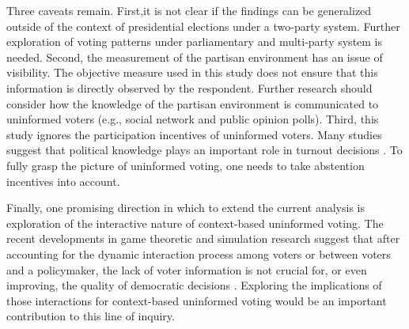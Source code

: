 \documentclass[letterpaper, 12pt]{article}
\begin{document}
    \par Three caveats remain. First,it is not clear if the findings can be generalized outside of the context of presidential elections under a two-party system. Further exploration of voting patterns under parliamentary and multi-party system is needed. Second, the measurement of the partisan environment has an issue of visibility. The objective measure used in this study does not ensure that this information is directly observed by the respondent. Further research should consider how the knowledge of the partisan environment is communicated to uninformed voters (e.g., social network and public opinion polls). Third, this study ignores the participation incentives of uninformed voters. Many studies suggest that political knowledge plays an important role in turnout decisions \citep{Matsusaka1995exvo, Dellicarpini1996wham, Feddersen1996thsw, Lassen2005thef, Larcinese2007dopo, Gemenis2014voad}. To fully grasp the picture of uninformed voting, one needs to take abstention incentives into account.
    
    \par Finally, one promising direction in which to extend the current analysis is exploration of the interactive nature of context-based uninformed voting. The recent developments in game theoretic and simulation research suggest that after accounting for the dynamic interaction process among voters or between voters and a policymaker, the lack of voter information is not crucial for, or even improving, the quality of democratic decisions \citep{Ashworth2014isvo, Couzin2011unin}. Exploring the implications of those interactions for context-based uninformed voting would be an important contribution to this line of inquiry. 
    
    \singlespacing
    
    

    
    
\end{document}
